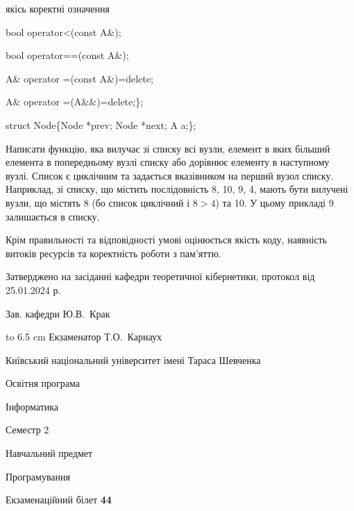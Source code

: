 \documentclass[12pt, ukrainian]{article}
\begin{document}
{\quad  якісь коректні означення 

\quad  bool operator<(const A\&); 

\quad  bool operator==(const A\&); 

\quad A\& operator =(const A\&)=delete; 

\quad  A\& operator =(A\&\&)=delete;\};

struct Node\{Node *prev; Node *next; A a;\};

Написати функцію, яка вилучає зі списку всі вузли, елемент в яких більший елемента в попередньому вузлі списку або дорівнює елементу в наступному вузлі. Список є циклічним та задається вказівником на перший вузол списку. Наприклад, зі списку, що містить послідовність 8, 10, 9, 4, мають бути вилучені вузли, що містять 8 (бо список циклічний і $8>4$) та 10. У цьому прикладі 9 залишається в списку.

Крім правильності та відповідності умові оцінюється якість коду, наявність витоків ресурсів та коректність роботи з пам'яттю. 

}
{\smallskip\smallskip \begin {scriptsize} Затверджено на засіданні кафедри теоретичної кібернетики, протокол   від   25.01.2024 р.\par\smallskip\smallskip\smallskip\smallskip
{\parbox {6.5 cm} {Зав. кафедри \dotfill Ю.В.~Крак}}\hspace {0.7cm} {\hbox to 6.5 cm { Екзаменатор \dotfill Т.О.~Карнаух}} \end{scriptsize}}
\newpage
{{\begin {scriptsize}\par
{ \center  Київський національний університет імені Тараса Шевченка \par}
{\parbox {5 cm}{Освітня програма \hfill}{\parbox {7 cm}{Інформатика\hfill}}\parbox {6 cm}{\hfill Семестр 2}}\par
{\parbox {5 cm} {Навчальний предмет \hfill}\parbox {7 cm}{Програмування \hfill}\parbox {6cm}{\hfill}\par}\vspace{-15pt} \end{scriptsize}}{\center Екзаменаційний білет \No \textbf { 44 }\par}}
\end{document}
